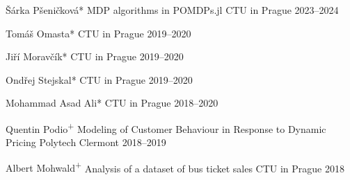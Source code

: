 \vspace{-0.8cm}
\begin{cvhonors}
  \cvhonor
    {Šárka Pšeničková*} %
    {MDP algorithms in POMDPs.jl} %
    {CTU in Prague} %
    {2023--2024} %

  \cvhonor
    {Tomáš Omasta*} %
    {} %
    {CTU in Prague} %
    {2019--2020} %

  \cvhonor
    {Jiří Moravčík*} %
    {} %
    {CTU in Prague} %
    {2019--2020} %

  \cvhonor
    {Ondřej Stejskal*} %
    {} %
    {CTU in Prague} %
    {2019--2020} %

  \cvhonor
    {Mohammad Asad Ali*} %
    {} %
    {CTU in Prague} %
    {2018--2020} %

  \cvhonor
    {Quentin Podio\textsuperscript{+}} %
    {Modeling of Customer Behaviour in Response to Dynamic Pricing} %
    {\hspace{-3em}Polytech Clermont} %
    {2018--2019} %

  \cvhonor
    {Albert Mohwald\textsuperscript{+}} %
    {Analysis of a dataset of bus ticket sales} %
    {CTU in Prague} %
    {2018} %

\end{cvhonors}
